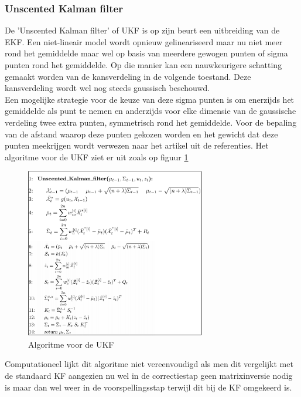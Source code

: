 \documentclass{book}
\begin{document}
\subsubsection{Unscented Kalman filter}
De 'Unscented Kalman filter' of UKF is op zijn beurt een uitbreiding van de EKF. Een niet-lineair model wordt opnieuw gelineariseerd maar nu niet meer rond het gemiddelde maar wel op basis van meerdere gewogen punten of sigma punten rond het gemiddelde. Op die manier kan een nauwkeurigere schatting gemaakt worden van de kansverdeling in de volgende toestand. Deze kansverdeling wordt wel nog steeds gaussisch beschouwd.\\
Een mogelijke strategie voor de keuze van deze sigma punten is om enerzijds het gemiddelde als punt te nemen en anderzijds voor elke dimensie van de gaussische verdeling twee extra punten, symmetrisch rond het gemiddelde. Voor de bepaling van de afstand waarop deze punten gekozen worden en het gewicht dat deze punten meekrijgen wordt verwezen naar het artikel \cite{unscented} uit de referenties. Het algoritme voor de UKF ziet er uit zoals op figuur \ref{unscented}



\begin{figure}[h!]
	\centering
	\includegraphics[width = 0.7\textwidth]{UnscentedKalman}
	\caption{Algoritme voor de UKF \cite{Course}}
	\label{unscented}
\end{figure}
Computationeel lijkt dit algoritme niet vereenvoudigd als men dit vergelijkt met de standaard KF aangezien nu wel in de correctiestap geen matrixinversie nodig is maar dan wel weer in de voorspellingsstap terwijl dit bij de KF omgekeerd is. 
\end{document}
